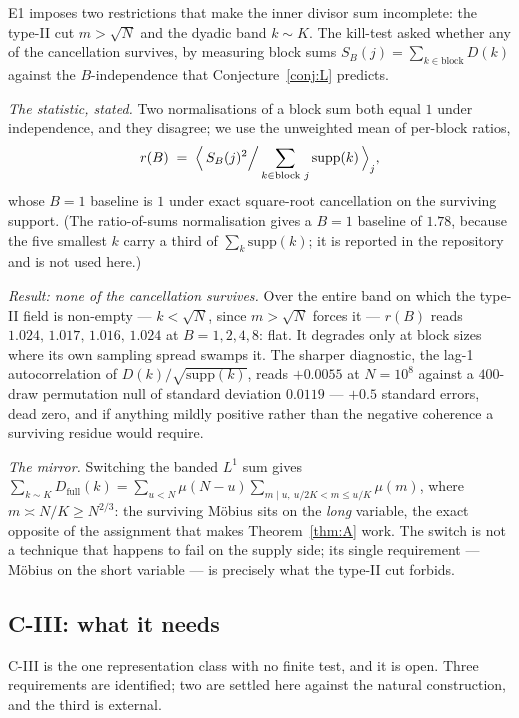 \documentclass[11pt,a4paper]{article}
\theoremstyle{plain}
\theoremstyle{definition}
\begin{document}
E1 imposes two restrictions that make the inner divisor sum
incomplete: the type-II cut $m > \sqrt N$ and the dyadic band
$k \sim K$. The kill-test asked whether any of the cancellation
survives, by measuring block sums $S_B(j) = \sum_{k\in\text{block}}D(k)$
against the $B$-independence that Conjecture~\ref{conj:L} predicts.

\emph{The statistic, stated.} Two normalisations of a block sum both
equal $1$ under independence, and they disagree; we use the
unweighted mean of per-block ratios,
\[
  r(B) \;=\; \Bigl\langle\,
    S_B(j)^2 \Big/ \sum_{k\in\text{block }j}\mathrm{supp}(k)
  \,\Bigr\rangle_j ,
\]
whose $B=1$ baseline is $1$ under exact square-root cancellation on the
surviving support. (The ratio-of-sums normalisation gives a $B=1$
baseline of $1.78$, because the five smallest $k$ carry a third of
$\sum_k\mathrm{supp}(k)$; it is reported in the repository and is not
used here.)

\emph{Result: none of the cancellation survives.} Over the entire band
on which the type-II field is non-empty --- $k<\sqrt N$, since
$m>\sqrt N$ forces it --- $r(B)$ reads $1.024,\,1.017,\,1.016,\,1.024$
at $B=1,2,4,8$: flat. It degrades only at block sizes where its own
sampling spread swamps it. The sharper diagnostic, the lag-1
autocorrelation of $D(k)/\sqrt{\mathrm{supp}(k)}$, reads $+0.0055$ at
$N=10^8$ against a $400$-draw permutation null of standard deviation
$0.0119$ --- $+0.5$ standard errors, dead zero, and if anything mildly
positive rather than the negative coherence a surviving residue would
require.

\emph{The mirror.} Switching the banded $L^1$ sum gives
$\sum_{k\sim K}D_{\text{full}}(k)
 = \sum_{u<N}\mu(N-u)\sum_{m\mid u,\ u/2K<m\le u/K}\mu(m)$, where
$m \asymp N/K \ge N^{2/3}$: the surviving M\"obius sits on the
\emph{long} variable, the exact opposite of the assignment that makes
Theorem~\ref{thm:A} work. The switch is not a technique that happens
to fail on the supply side; its single requirement --- M\"obius on the
short variable --- is precisely what the type-II cut forbids.

\subsection{C-III: what it needs}\label{sec:c3}

C-III is the one representation class with no finite test, and it is
open. Three requirements are identified; two are settled here against
the natural construction, and the third is external.
\end{document}
